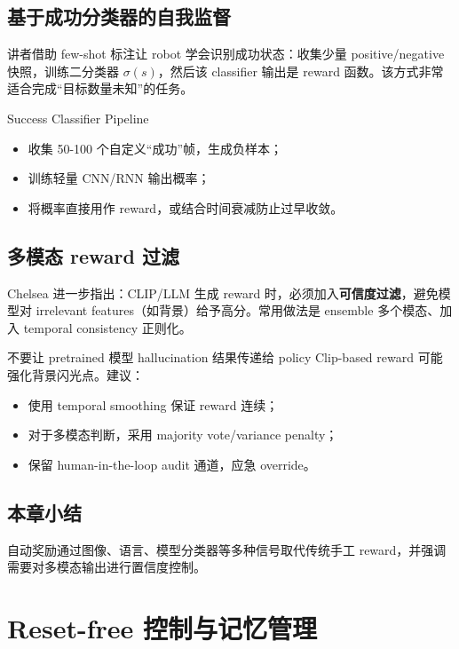 \documentclass[a4paper]{article}
\begin{document}
\subsection{基于成功分类器的自我监督}
讲者借助 few-shot 标注让 robot 学会识别成功状态：收集少量 positive/negative 快照，训练二分类器 $\sigma(s)$，然后该 classifier 输出是 reward 函数。该方式非常适合完成“目标数量未知”的任务。

\begin{knowledgebox}{Success Classifier Pipeline}
\begin{itemize}
\item 收集 50-100 个自定义“成功”帧，生成负样本；\\
\item 训练轻量 CNN/RNN 输出概率；\\
\item 将概率直接用作 reward，或结合时间衰减防止过早收敛。
\end{itemize}
\end{knowledgebox}

\subsection{多模态 reward 过滤}
Chelsea 进一步指出：CLIP/LLM 生成 reward 时，必须加入\textbf{可信度过滤}，避免模型对 irrelevant features（如背景）给予高分。常用做法是 ensemble 多个模态、加入 temporal consistency 正则化。

\begin{warningbox}{不要让 pretrained 模型 hallucination 结果传递给 policy}
Clip-based reward 可能强化背景闪光点。建议：
\begin{itemize}
\item 使用 temporal smoothing 保证 reward 连续；\\
\item 对于多模态判断，采用 majority vote/variance penalty；\\
\item 保留 human-in-the-loop audit 通道，应急 override。
\end{itemize}
\end{warningbox}

\subsection{本章小结}
自动奖励通过图像、语言、模型分类器等多种信号取代传统手工 reward，并强调需要对多模态输出进行置信度控制。
\newpage

\section{Reset-free 控制与记忆管理}
\end{document}
